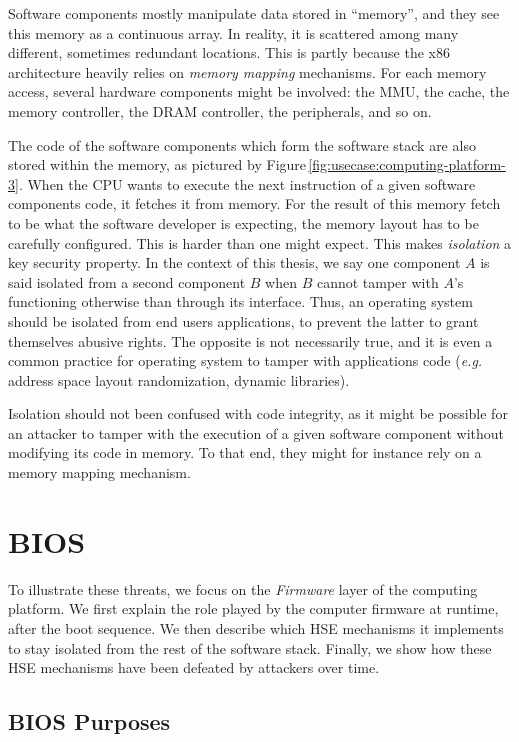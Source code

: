 Software components mostly manipulate data stored in ``memory'', and they see
this memory as a continuous array.
%
In reality, it is scattered among many different, sometimes redundant locations.
%
This is partly because the x86 architecture heavily relies on \emph{memory
  mapping} mechanisms.
%
For each memory access, several hardware components might be involved: the MMU,
the cache, the memory controller, the DRAM controller, the peripherals, and so
on.

The code of the software components which form the software stack are also
stored within the memory, as pictured by
Figure\,\ref{fig:usecase:computing-platform-3}.
%
When the CPU wants to execute the next instruction of a given software
components code, it fetches it from memory.
%
For the result of this memory fetch to be what the software developer is
expecting, the memory layout has to be carefully configured.
%
This is harder than one might expect.
%
This makes \emph{isolation} a key security property.
%
In the context of this thesis, we say one component $A$ is said isolated from a
second component $B$ when $B$ cannot tamper with $A$'s functioning otherwise
than through its interface.
%
Thus, an operating system should be isolated from end users applications, to
prevent the latter to grant themselves abusive rights.
%
The opposite is not necessarily true, and it is even a common practice for
operating system to tamper with applications code (\emph{e.g.} address space
layout randomization, dynamic libraries).

Isolation should not been confused with code integrity, as it might be possible
for an attacker to tamper with the execution of a given software component
without modifying its code in memory.
%
To that end, they might for instance rely on a memory mapping mechanism.


\section{BIOS}
\label{sec:usecase:firmware}

To illustrate these threats, we focus on the \emph{Firmware} layer of the
computing platform.
%
We first explain the role played by the computer firmware at runtime, after the
boot sequence.
%
We then describe which HSE mechanisms it implements to stay isolated from the
rest of the software stack.
%
Finally, we show how these HSE mechanisms have been defeated by attackers over
time.

\subsection{BIOS Purposes}


